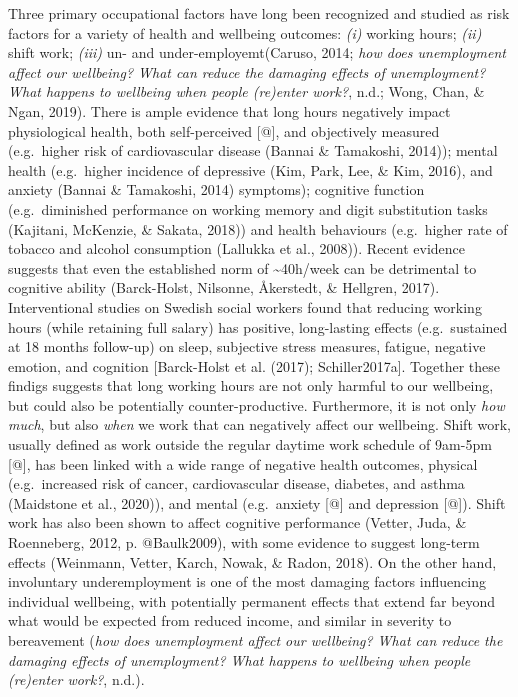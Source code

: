 \documentclass[
  english,
  man]{apa6}
\begin{document}
Three primary occupational factors have long been recognized and studied as risk factors for a variety of health and wellbeing outcomes: \emph{(i)} working hours; \emph{(ii)} shift work; \emph{(iii)} un- and under-employemt(Caruso, 2014; \emph{how does unemployment affect our wellbeing? What can reduce the damaging effects of unemployment? What happens to wellbeing when people (re)enter work?}, n.d.; Wong, Chan, \& Ngan, 2019). There is ample evidence that long hours negatively impact physiological health, both self-perceived {[}@{]}, and objectively measured (e.g.~higher risk of cardiovascular disease (Bannai \& Tamakoshi, 2014)); mental health (e.g.~higher incidence of depressive (Kim, Park, Lee, \& Kim, 2016), and anxiety (Bannai \& Tamakoshi, 2014) symptoms); cognitive function (e.g.~diminished performance on working memory and digit substitution tasks (Kajitani, McKenzie, \& Sakata, 2018)) and health behaviours (e.g.~higher rate of tobacco and alcohol consumption (Lallukka et al., 2008)). Recent evidence suggests that even the established norm of \textasciitilde40h/week can be detrimental to cognitive ability (Barck-Holst, Nilsonne, Åkerstedt, \& Hellgren, 2017). Interventional studies on Swedish social workers found that reducing working hours (while retaining full salary) has positive, long-lasting effects (e.g.~sustained at 18 months follow-up) on sleep, subjective stress measures, fatigue, negative emotion, and cognition {[}Barck-Holst et al. (2017); Schiller2017a{]}. Together these findigs suggests that long working hours are not only harmful to our wellbeing, but could also be potentially counter-productive. Furthermore, it is not only \emph{how much}, but also \emph{when} we work that can negatively affect our wellbeing. Shift work, usually defined as work outside the regular daytime work schedule of 9am-5pm {[}@{]}, has been linked with a wide range of negative health outcomes, physical (e.g.~increased risk of cancer, cardiovascular disease, diabetes, and asthma (Maidstone et al., 2020)), and mental (e.g.~anxiety {[}@{]} and depression {[}@{]}). Shift work has also been shown to affect cognitive performance (Vetter, Juda, \& Roenneberg, 2012, p. @Baulk2009), with some evidence to suggest long-term effects (Weinmann, Vetter, Karch, Nowak, \& Radon, 2018). On the other hand, involuntary underemployment is one of the most damaging factors influencing individual wellbeing, with potentially permanent effects that extend far beyond what would be expected from reduced income, and similar in severity to bereavement (\emph{how does unemployment affect our wellbeing? What can reduce the damaging effects of unemployment? What happens to wellbeing when people (re)enter work?}, n.d.).
\end{document}
